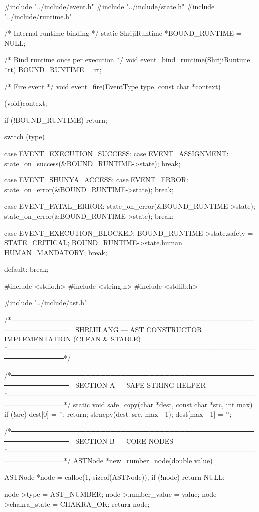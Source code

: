 \documentclass{article}
\begin{document}
#include "../include/event.h"
#include "../include/state.h"
#include "../include/runtime.h"

/* Internal runtime binding */
static ShrijiRuntime *BOUND_RUNTIME = NULL;

/* Bind runtime once per execution */
void event_bind_runtime(ShrijiRuntime *rt)
{
    BOUND_RUNTIME = rt;
}

/* Fire event */
void event_fire(EventType type, const char *context)
{
    (void)context;

    if (!BOUND_RUNTIME)
        return;

    switch (type)
    {
        case EVENT_EXECUTION_SUCCESS:
        case EVENT_ASSIGNMENT:
            state_on_success(&BOUND_RUNTIME->state);
            break;

        case EVENT_SHUNYA_ACCESS:
        case EVENT_ERROR:
            state_on_error(&BOUND_RUNTIME->state);
            break;

        case EVENT_FATAL_ERROR:
            state_on_error(&BOUND_RUNTIME->state);
            state_on_error(&BOUND_RUNTIME->state);
            break;

        case EVENT_EXECUTION_BLOCKED:
            BOUND_RUNTIME->state.safety = STATE_CRITICAL;
            BOUND_RUNTIME->state.human  = HUMAN_MANDATORY;
            break;

        default:
            break;
    }
}
#include <stdio.h>
#include <string.h>
#include <stdlib.h>

#include "../include/ast.h"

/*──────────────────────────────────────────────────────────────
 |  SHRIJILANG — AST CONSTRUCTOR IMPLEMENTATION (CLEAN & STABLE)
 *──────────────────────────────────────────────────────────────*/

/*──────────────────────────────────────────────────────────────
 | SECTION A — SAFE STRING HELPER
 *──────────────────────────────────────────────────────────────*/
static void safe_copy(char *dest, const char *src, int max)
{
    if (!src) {
        dest[0] = '\0';
        return;
    }
    strncpy(dest, src, max - 1);
    dest[max - 1] = '\0';
}

/*──────────────────────────────────────────────────────────────
 | SECTION B — CORE NODES
 *──────────────────────────────────────────────────────────────*/
ASTNode *new_number_node(double value)
{
    ASTNode *node = calloc(1, sizeof(ASTNode));
    if (!node) return NULL;

    node->type = AST_NUMBER;
    node->number_value = value;
    node->chakra_state = CHAKRA_OK;
    return node;
}
\end{document}
